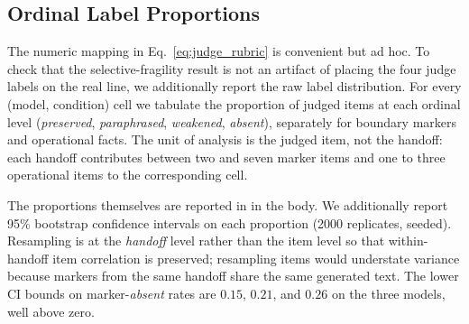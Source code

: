 \subsection{Ordinal Label Proportions}
\label{app:ordinal_labels}

The numeric mapping in Eq.~\ref{eq:judge_rubric} is convenient but ad hoc. To check that the selective-fragility result is not an artifact of placing the four judge labels on the real line, we additionally report the raw label distribution. For every (model, condition) cell we tabulate the proportion of judged items at each ordinal level (\emph{preserved}, \emph{paraphrased}, \emph{weakened}, \emph{absent}), separately for boundary markers and operational facts. The unit of analysis is the judged item, not the handoff: each handoff contributes between two and seven marker items and one to three operational items to the corresponding cell.


% 

The proportions themselves are reported in  in the body. We additionally report 95\% bootstrap confidence intervals on each proportion (2000 replicates, seeded). Resampling is at the \emph{handoff} level rather than the item level so that within-handoff item correlation is preserved; resampling items would understate variance because markers from the same handoff share the same generated text. The lower CI bounds on marker-\emph{absent} rates are $0.15$, $0.21$, and $0.26$ on the three models, well above zero.

